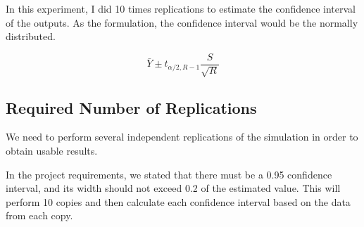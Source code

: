 \documentclass{article}
\begin{document}
In this experiment, I did 10 times replications to estimate the confidence interval of the outputs. As the formulation, the confidence interval would be the normally distributed.

\begin{equation}
\bar Y\pm t_{\alpha / 2, R-1}\frac{S}{\sqrt R}
\end{equation}


\subsection{Required Number of Replications}
We need to perform several independent replications of the simulation in order to obtain usable results.

In the project requirements, we stated that there must be a 0.95 confidence interval, and its width should not exceed 0.2 of the estimated value. This will perform 10 copies and then calculate each confidence interval based on the data from each copy.
\end{document}
